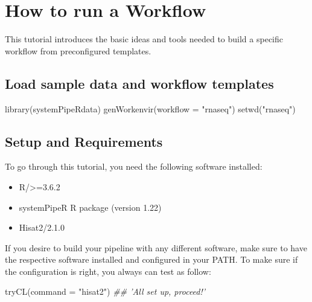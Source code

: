 \documentclass[14pt,]{article}
\providecommand{\tightlist}{%
  \setlength{\itemsep}{0pt}\setlength{\parskip}{0pt}}
\newcommand{\hlstr}[1]{\textcolor[rgb]{0.251,0.627,0.251}{#1}}%
\newcommand{\hlcom}[1]{\textcolor[rgb]{0.502,0.502,0.502}{\textit{#1}}}%
\newcommand{\hlstd}[1]{\textcolor[rgb]{0.251,0.251,0.251}{#1}}%
\newcommand{\hlkwc}[1]{\textcolor[rgb]{0.251,0.251,0.251}{#1}}%
\newcommand{\hlkwd}[1]{\textcolor[rgb]{0.878,0.439,0.125}{#1}}%
\newenvironment{Shaded}{\begin{myshaded}}{\end{myshaded}}
\newcommand{\KeywordTok}[1]{\hlkwd{#1}}
\newcommand{\DataTypeTok}[1]{\hlkwc{#1}}
\newcommand{\StringTok}[1]{\hlstr{#1}}
\newcommand{\CommentTok}[1]{\hlcom{#1}}
\newcommand{\NormalTok}[1]{\hlstd{#1}}
\begin{document}
\hypertarget{how-to-run-a-workflow}{%
\section{How to run a Workflow}\label{how-to-run-a-workflow}}

This tutorial introduces the basic ideas and tools needed to build a specific workflow from preconfigured templates.

\hypertarget{load-sample-data-and-workflow-templates-1}{%
\subsection{Load sample data and workflow templates}\label{load-sample-data-and-workflow-templates-1}}

\begin{Shaded}
\begin{Highlighting}[]
\KeywordTok{library}\NormalTok{(systemPipeRdata)}
\KeywordTok{genWorkenvir}\NormalTok{(}\DataTypeTok{workflow =} \StringTok{"rnaseq"}\NormalTok{)}
\KeywordTok{setwd}\NormalTok{(}\StringTok{"rnaseq"}\NormalTok{)}
\end{Highlighting}
\end{Shaded}

\hypertarget{setup-and-requirements}{%
\subsection{Setup and Requirements}\label{setup-and-requirements}}

To go through this tutorial, you need the following software installed:

\begin{itemize}
\tightlist
\item
  R/\textgreater{}=3.6.2
\item
  systemPipeR R package (version 1.22)
\item
  Hisat2/2.1.0
\end{itemize}

If you desire to build your pipeline with any different software, make sure to have the respective software installed and configured in your PATH. To make sure if the configuration is right, you always can test as follow:

\begin{Shaded}
\begin{Highlighting}[]
\KeywordTok{tryCL}\NormalTok{(}\DataTypeTok{command =} \StringTok{"hisat2"}\NormalTok{)  }\CommentTok{## 'All set up, proceed!'}
\end{Highlighting}
\end{Shaded}
\end{document}
